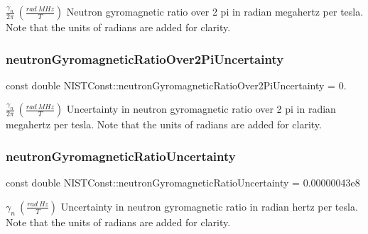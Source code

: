 $\frac{\gamma_n}{2\pi} \ (\frac{rad\ MHz}{T})$ Neutron gyromagnetic ratio over 2 pi in radian megahertz per tesla. Note that the units of radians are added for clarity. \mbox{\label{group___n_i_s_t_const-_neutron_ga428e1a7239cc03c9e202ac1acbb39d42}} 
\subsubsection{\texorpdfstring{neutron\+Gyromagnetic\+Ratio\+Over2\+Pi\+Uncertainty}{neutronGyromagneticRatioOver2PiUncertainty}}
{\footnotesize\ttfamily const double N\+I\+S\+T\+Const\+::neutron\+Gyromagnetic\+Ratio\+Over2\+Pi\+Uncertainty = 0.}

$\frac{\gamma_n}{2\pi} \ (\frac{rad\ MHz}{T})$ Uncertainty in neutron gyromagnetic ratio over 2 pi in radian megahertz per tesla. Note that the units of radians are added for clarity. \mbox{\label{group___n_i_s_t_const-_neutron_ga4f48bb36482cdd64b95e17e52939df96}} 
\subsubsection{\texorpdfstring{neutron\+Gyromagnetic\+Ratio\+Uncertainty}{neutronGyromagneticRatioUncertainty}}
{\footnotesize\ttfamily const double N\+I\+S\+T\+Const\+::neutron\+Gyromagnetic\+Ratio\+Uncertainty = 0.\+00000043e8}

$\gamma_n \ (\frac{rad\ Hz}{T})$ Uncertainty in neutron gyromagnetic ratio in radian hertz per tesla. Note that the units of radians are added for clarity. \mbox{\label{group___n_i_s_t_const-_neutron_ga42a101bcaf7105edbfd6c06de9633d22}} 
